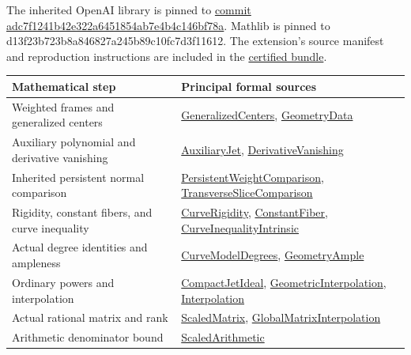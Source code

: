 The inherited OpenAI library is pinned to \href{https://github.com/openai/math/tree/adc7f1241b42e322a6451854ab7e4b4c146bf78a}{commit adc7f1241b42e322a6451854ab7e4b4c146bf78a}. Mathlib is pinned to d13f23b723b8a846827a245b89c10fc7d3f11612. The extension's source manifest and reproduction instructions are included in the \href{run:lean/README.md}{certified bundle}.

\small
\begin{longtable}{@{}>{\raggedright\arraybackslash}p{}>{\raggedright\arraybackslash}p{}@{}}
\toprule
\textbf{Mathematical step} & \textbf{Principal formal sources}\\
\midrule
\endhead
Weighted frames and generalized centers & \href{run:lean/Logarithm/GeneralizedCenters.lean}{GeneralizedCenters}, \href{run:lean/Logarithm/GeometryData.lean}{GeometryData}\\[5pt]
Auxiliary polynomial and derivative vanishing & \href{run:lean/Logarithm/AuxiliaryJet.lean}{AuxiliaryJet}, \href{run:lean/Logarithm/DerivativeVanishing.lean}{DerivativeVanishing}\\[5pt]
Inherited persistent normal comparison & \href{run:lean/OAI/NumberTheory/PiExponent/Approximation/PersistentWeightComparison.lean}{PersistentWeightComparison}, \href{run:lean/OAI/NumberTheory/PiExponent/Jets/TransverseSliceComparison.lean}{TransverseSliceComparison}\\[5pt]
Rigidity, constant fibers, and curve inequality & \href{run:lean/Logarithm/CurveRigidity.lean}{CurveRigidity}, \href{run:lean/Logarithm/ConstantFiber.lean}{ConstantFiber}, \href{run:lean/Logarithm/CurveInequalityIntrinsic.lean}{CurveInequalityIntrinsic}\\[5pt]
Actual degree identities and ampleness & \href{run:lean/Logarithm/CurveModelDegrees.lean}{CurveModelDegrees}, \href{run:lean/Logarithm/GeometryAmple.lean}{GeometryAmple}\\[5pt]
Ordinary powers and interpolation & \href{run:lean/Logarithm/CompactJetIdeal.lean}{CompactJetIdeal}, \href{run:lean/Logarithm/GeometricInterpolation.lean}{GeometricInterpolation}, \href{run:lean/Logarithm/Interpolation.lean}{Interpolation}\\[5pt]
Actual rational matrix and rank & \href{run:lean/Logarithm/ScaledMatrix.lean}{ScaledMatrix}, \href{run:lean/Logarithm/GlobalMatrixInterpolation.lean}{GlobalMatrixInterpolation}\\[5pt]
Arithmetic denominator bound & \href{run:lean/Logarithm/ScaledArithmetic.lean}{ScaledArithmetic}\\[5pt]

\end{longtable}
